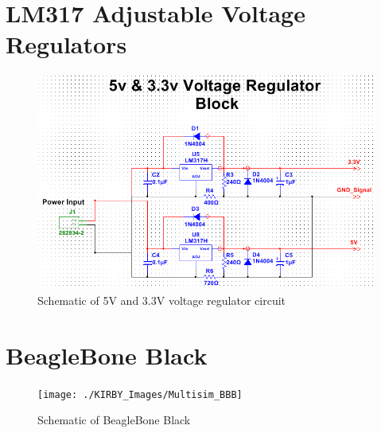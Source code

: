\section{LM317 Adjustable Voltage Regulators}
\begin{figure}[H]
\centering
\includegraphics[width=\textwidth,height=\textheight,keepaspectratio]{./KIRBY_Images/Multisim_VoltageRegulation}
\caption{Schematic of 5V and 3.3V voltage regulator circuit}
\label{fig:Schematic_VoltageReg}
\end{figure}

\section{BeagleBone Black}
\begin{figure}[H]
\centering
\texttt{[image: ./KIRBY\_Images/Multisim\_BBB]}
\caption{Schematic of BeagleBone Black}
\label{fig:Schematic_BBB}
\end{figure}

